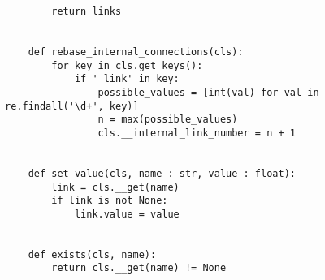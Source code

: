 \begin{lstlisting}
        return links
    
    
    def rebase_internal_connections(cls):
        for key in cls.get_keys():
            if '_link' in key:
                possible_values = [int(val) for val in re.findall('\d+', key)]
                n = max(possible_values)
                cls.__internal_link_number = n + 1
    
    
    def set_value(cls, name : str, value : float):
        link = cls.__get(name)
        if link is not None:
            link.value = value
    
    
    def exists(cls, name):
        return cls.__get(name) != None
\end{lstlisting}



